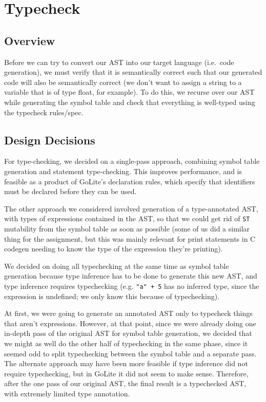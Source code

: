 \documentclass[11pt]{article}
\begin{document}
\section{Typecheck}
\subsection{Overview}
Before we can try to convert our AST into our target language (i.e.\
code generation), we must verify that it is semantically correct such
that our generated code will also be semantically correct (we don't
want to assign a string to a variable that is of type float, for
example). To do this, we recurse over our AST while generating the
symbol table and check that everything is well-typed using the
typecheck rules/spec\cite{golite-typecheck}.
\subsection{Design Decisions}
For type-checking, we decided on a single-pass approach, combining
symbol table generation and statement type-checking. This improves
performance, and is feasible as a product of GoLite's declaration
rules, which specify that identifiers must be declared before they can
be used.

The other approach we considered involved generation of a
type-annotated AST, with types of expressions contained in the AST, so
that we could get rid of \texttt{ST} mutability from the symbol table
as soon as possible (some of us did a similar thing for the
assignment, but this was mainly relevant for print statements in C
codegen needing to know the type of the expression they're printing).

We decided on doing all typechecking at the same time as symbol table
generation because type inference has to be done to generate this new
AST, and type inference requires typechecking (e.g. \texttt{"a" + 5}
has no inferred type, since the expression is undefined; we only know
this because of typechecking).

At first, we were going to generate an annotated AST only to typecheck
things that aren't expressions. However, at that point, since we were
already doing one in-depth pass of the original AST for symbol table
generation, we decided that we might as well do the other half of
typechecking in the same phase, since it seemed odd to split
typechecking between the symbol table and a separate pass. The
alternate approach may have been more feasible if type inference did
not require typechecking, but in GoLite it did not seem to make
sense. Therefore, after the one pass of our original AST, the final
result is a typechecked AST, with extremely limited type annotation.
\end{document}
